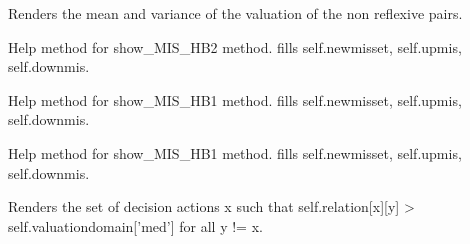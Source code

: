 \documentclass[letterpaper,10pt,english]{sphinxmanual}
\begin{document}
\begin{fulllineitems}
\begin{fulllineitems}
\end{fulllineitems}


\begin{fulllineitems}
\label{techDoc:digraphs.Digraph.computeValuationStatistics}
Renders the mean and variance of the valuation
of the non reflexive pairs.

\end{fulllineitems}


\begin{fulllineitems}
\label{techDoc:digraphs.Digraph.computeupdown1}
Help method for show\_MIS\_HB2 method.
fills self.newmisset, self.upmis, self.downmis.

\end{fulllineitems}


\begin{fulllineitems}
\label{techDoc:digraphs.Digraph.computeupdown2}
Help method for show\_MIS\_HB1 method.
fills self.newmisset, self.upmis, self.downmis.

\end{fulllineitems}


\begin{fulllineitems}
\label{techDoc:digraphs.Digraph.computeupdown2irred}
Help method for show\_MIS\_HB1 method.
fills self.newmisset, self.upmis, self.downmis.

\end{fulllineitems}


\begin{fulllineitems}
\label{techDoc:digraphs.Digraph.condorcetWinners}
Renders the set of decision actions x such that
self.relation{[}x{]}{[}y{]} \textgreater{} self.valuationdomain{[}'med'{]}
for all y != x.


\end{fulllineitems}
\end{fulllineitems}
\end{document}
